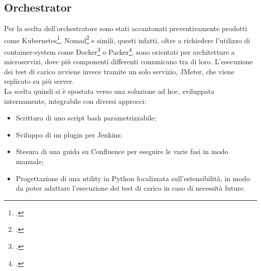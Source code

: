 \subsection{Orchestrator}
Per la scelta dell'orchestratore sono stati accantonati preventivamente prodotti come Kubernetes\footcite{site:kubernetes}, Nomad\footcite{site:nomad} e simili, questi infatti, oltre a richiedere l'utilizzo di \gls{container-system} come Docker\footcite{site:docker} o Packer\footcite{site:packer}, sono orientati per architetture a 	\gls{microservizi}, dove più componenti differenti comunicano tra di loro. L'esecuzione dei test di carico avviene invece tramite un solo servizio, JMeter, che viene replicato su più server. \\
La scelta quindi si è spostata verso una soluzione ad hoc, sviluppata internamente, integrabile con diversi approcci:
\begin{itemize}
	\item Scrittura di uno script bash parametrizzabile;
	\item Sviluppo di un \gls{plugin} per Jenkins;
	\item Stesura di una guida su Confluence per eseguire le varie fasi in modo manuale;
	\item Progettazione di una utility in Python focalizzata sull'estensibilità, in modo da poter adattare l'esecuzione dei test di carico in caso di necessità future.
\end{itemize}
